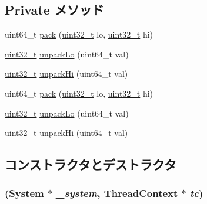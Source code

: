 \subsection*{Private メソッド}
\begin{DoxyCompactItemize}
\item 
uint64\_\-t \hyperlink{classMipsISA_1_1RemoteGDB_ab949ca65737c1211d9722edae7e87391}{pack} (\hyperlink{Type_8hh_a435d1572bf3f880d55459d9805097f62}{uint32\_\-t} lo, \hyperlink{Type_8hh_a435d1572bf3f880d55459d9805097f62}{uint32\_\-t} hi)
\item 
\hyperlink{Type_8hh_a435d1572bf3f880d55459d9805097f62}{uint32\_\-t} \hyperlink{classMipsISA_1_1RemoteGDB_ab2ac5a2c8591b00c18036768b519c035}{unpackLo} (uint64\_\-t val)
\item 
\hyperlink{Type_8hh_a435d1572bf3f880d55459d9805097f62}{uint32\_\-t} \hyperlink{classMipsISA_1_1RemoteGDB_a00ef221030b6ba76f5bad6e8b1e8cd82}{unpackHi} (uint64\_\-t val)
\item 
uint64\_\-t \hyperlink{classMipsISA_1_1RemoteGDB_ab949ca65737c1211d9722edae7e87391}{pack} (\hyperlink{Type_8hh_a435d1572bf3f880d55459d9805097f62}{uint32\_\-t} lo, \hyperlink{Type_8hh_a435d1572bf3f880d55459d9805097f62}{uint32\_\-t} hi)
\item 
\hyperlink{Type_8hh_a435d1572bf3f880d55459d9805097f62}{uint32\_\-t} \hyperlink{classMipsISA_1_1RemoteGDB_ab2ac5a2c8591b00c18036768b519c035}{unpackLo} (uint64\_\-t val)
\item 
\hyperlink{Type_8hh_a435d1572bf3f880d55459d9805097f62}{uint32\_\-t} \hyperlink{classMipsISA_1_1RemoteGDB_a00ef221030b6ba76f5bad6e8b1e8cd82}{unpackHi} (uint64\_\-t val)
\end{DoxyCompactItemize}


\subsection{コンストラクタとデストラクタ}
\hypertarget{classMipsISA_1_1RemoteGDB_a378793e7a68420568b51f355b7e8c473}{
\subsubsection[{RemoteGDB}]{ ({\bf System} $\ast$ {\em \_\-system}, \/  {\bf ThreadContext} $\ast$ {\em tc})}}
\label{classMipsISA_1_1RemoteGDB_a378793e7a68420568b51f355b7e8c473}




